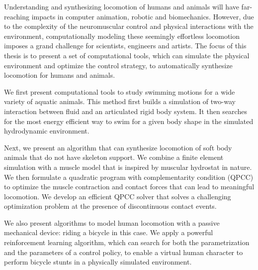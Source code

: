 Understanding and synthesizing locomotion of humans and animals will have far-reaching impacts in computer animation, robotic and biomechanics. However, due to the complexity of the neuromuscular control and physical interactions with the environment, computationally modeling these seemingly effortless locomotion imposes a grand challenge for scientists, engineers and artists. The focus of this thesis is to present a set of computational tools, which can simulate the physical environment and optimize the control strategy, to automatically synthesize locomotion for humans and animals.

We first present computational tools to study swimming motions for a wide variety of aquatic animals. This method first builds a simulation of two-way interaction between fluid and an articulated rigid body system. It then searches for the most energy efficient way to swim for a given body shape in the simulated hydrodynamic environment.

Next, we present an algorithm that can synthesize locomotion of soft body animals that do not have skeleton support. We combine a finite element simulation with a muscle model that is inspired by muscular hydrostat in nature. We then formulate a quadratic program with complementarity condition (QPCC) to optimize the muscle contraction and contact forces that can lead to meaningful locomotion. We develop an efficient QPCC solver that solves a challenging optimization problem at the presence of discontinuous contact events.

We also present algorithms to model human locomotion with a passive mechanical device: riding a bicycle in this case. We apply a powerful reinforcement learning algorithm, which can search for both the parametrization and the parameters of a control policy, to enable a virtual human character to perform bicycle stunts in a physically simulated environment.


